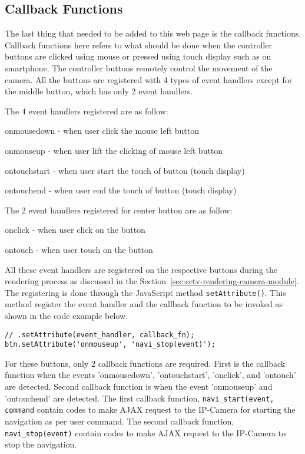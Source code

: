 \subsection{Callback Functions}
The last thing that needed to be added to this web page is the callback functions. Callback functions here refers to what should be done when the controller buttons are clicked using mouse or pressed using touch display such as on smartphone. The controller buttons remotely control the movement of the camera. All the buttons are registered with 4 types of event handlers except for the middle button, which has only 2 event handlers.

The 4 event handlers registered are as follow:
\begin{itemize*}
\item onmousedown - when user click the mouse left button
\item onmouseup - when user lift the clicking of mouse left button
\item ontouchstart - when user start the touch of button (touch display)
\item ontouchend - when user end the touch of button (touch display)
\end{itemize*}

The 2 event handlers registered for center button are as follow:
\begin{itemize*}
\item onclick - when user click on the button
\item ontouch - when user touch on the button
\end{itemize*}

All these event handlers are registered on the respective buttons during the rendering process as discussed in the Section~\ref{sec:cctv-rendering-camera-module}. The registering is done through the JavaScript method \texttt{setAttribute()}. This method register the event handler and the callback function to be invoked as shown in the code example below.

\begin{lstlisting}
// .setAttribute(event_handler, callback_fn);
btn.setAttribute('onmouseup', 'navi_stop(event)');
\end{lstlisting}

For these buttons, only 2 callback functions are required. First is the callback function when the events 'onmousedown', 'ontouchstart', 'onclick', and 'ontouch' are detected. Second callback function is when the event 'onmouseup' and 'ontouchend' are detected. The first callback function, \texttt{navi\_start(event, command} contain codes to make AJAX request to the IP-Camera for starting the navigation as per user command. The second callback function, \texttt{navi\_stop(event)} contain codes to make AJAX request to the IP-Camera to stop the navigation.

